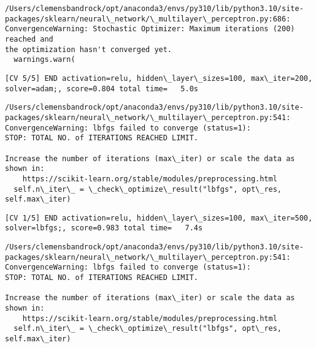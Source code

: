 \documentclass[11pt]{article}
\begin{document}
    \begin{Verbatim}[commandchars=\\\{\}]
/Users/clemensbandrock/opt/anaconda3/envs/py310/lib/python3.10/site-
packages/sklearn/neural\_network/\_multilayer\_perceptron.py:686:
ConvergenceWarning: Stochastic Optimizer: Maximum iterations (200) reached and
the optimization hasn't converged yet.
  warnings.warn(
    \end{Verbatim}

    \begin{Verbatim}[commandchars=\\\{\}]
[CV 5/5] END activation=relu, hidden\_layer\_sizes=100, max\_iter=200,
solver=adam;, score=0.804 total time=   5.0s
    \end{Verbatim}

    \begin{Verbatim}[commandchars=\\\{\}]
/Users/clemensbandrock/opt/anaconda3/envs/py310/lib/python3.10/site-
packages/sklearn/neural\_network/\_multilayer\_perceptron.py:541:
ConvergenceWarning: lbfgs failed to converge (status=1):
STOP: TOTAL NO. of ITERATIONS REACHED LIMIT.

Increase the number of iterations (max\_iter) or scale the data as shown in:
    https://scikit-learn.org/stable/modules/preprocessing.html
  self.n\_iter\_ = \_check\_optimize\_result("lbfgs", opt\_res, self.max\_iter)
    \end{Verbatim}

    \begin{Verbatim}[commandchars=\\\{\}]
[CV 1/5] END activation=relu, hidden\_layer\_sizes=100, max\_iter=500,
solver=lbfgs;, score=0.983 total time=   7.4s
    \end{Verbatim}

    \begin{Verbatim}[commandchars=\\\{\}]
/Users/clemensbandrock/opt/anaconda3/envs/py310/lib/python3.10/site-
packages/sklearn/neural\_network/\_multilayer\_perceptron.py:541:
ConvergenceWarning: lbfgs failed to converge (status=1):
STOP: TOTAL NO. of ITERATIONS REACHED LIMIT.

Increase the number of iterations (max\_iter) or scale the data as shown in:
    https://scikit-learn.org/stable/modules/preprocessing.html
  self.n\_iter\_ = \_check\_optimize\_result("lbfgs", opt\_res, self.max\_iter)
    \end{Verbatim}
\end{document}
